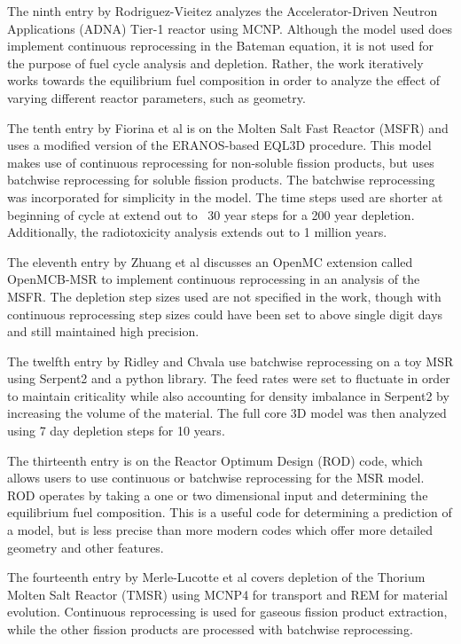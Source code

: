 The ninth entry by Rodriguez-Vieitez analyzes the Accelerator-Driven Neutron Applications (ADNA) Tier-1 reactor using MCNP. Although the model used does implement continuous reprocessing in the Bateman equation, it is not used for the purpose of fuel cycle analysis and depletion. Rather, the work iteratively works towards the equilibrium fuel composition in order to analyze the effect of varying different reactor parameters, such as geometry.

The tenth entry by Fiorina et al is on the Molten Salt Fast Reactor (MSFR) and uses a modified version of the ERANOS-based EQL3D procedure. This model makes use of continuous reprocessing for non-soluble fission products, but uses batchwise reprocessing for soluble fission products. The batchwise reprocessing was incorporated for simplicity in the model. The time steps used are shorter at beginning of cycle at extend out to ~30 year steps for a 200 year depletion. Additionally, the radiotoxicity analysis extends out to 1 million years.

The eleventh entry by Zhuang et al discusses an OpenMC extension called OpenMCB-MSR to implement continuous reprocessing in an analysis of the MSFR. The depletion step sizes used are not specified in the work, though with continuous reprocessing step sizes could have been set to above single digit days and still maintained high precision.

The twelfth entry by Ridley and Chvala use batchwise reprocessing on a toy MSR using Serpent2 and a python library. The feed rates were set to fluctuate in order to maintain criticality while also accounting for density imbalance in Serpent2 by increasing the volume of the material. The full core 3D model was then analyzed using 7 day depletion steps for 10 years.

The thirteenth entry is on the Reactor Optimum Design (ROD) code, which allows users to use continuous or batchwise reprocessing for the MSR model. ROD operates by taking a one or two dimensional input and determining the equilibrium fuel composition. This is a useful code for determining a prediction of a model, but is less precise than more modern codes which offer more detailed geometry and other features.

The fourteenth entry by Merle-Lucotte et al covers depletion of the Thorium Molten Salt Reactor (TMSR) using MCNP4 \cite{goluoglu_software_1998} for transport and REM for material evolution. Continuous reprocessing is used for gaseous fission product extraction, while the other fission products are processed with batchwise reprocessing.

